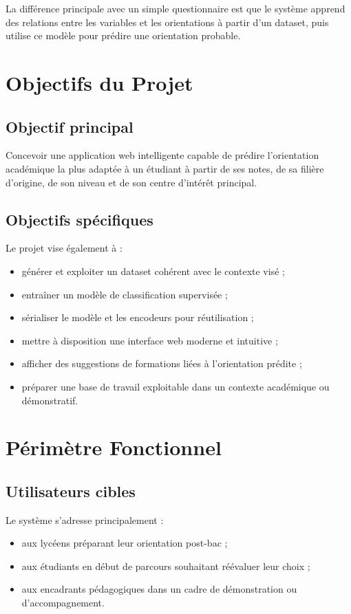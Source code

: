 \documentclass[12pt,a4paper]{report}
\begin{document}
La différence principale avec un simple questionnaire est que le système apprend des relations entre les variables et les orientations à partir d'un dataset, puis utilise ce modèle pour prédire une orientation probable.

\chapter{Objectifs du Projet}

\section{Objectif principal}
Concevoir une application web intelligente capable de prédire l'orientation académique la plus adaptée à un étudiant à partir de ses notes, de sa filière d'origine, de son niveau et de son centre d'intérêt principal.

\section{Objectifs spécifiques}
Le projet vise également à :
\begin{itemize}[label=--]
    \item générer et exploiter un dataset cohérent avec le contexte visé ;
    \item entraîner un modèle de classification supervisée ;
    \item sérialiser le modèle et les encodeurs pour réutilisation ;
    \item mettre à disposition une interface web moderne et intuitive ;
    \item afficher des suggestions de formations liées à l'orientation prédite ;
    \item préparer une base de travail exploitable dans un contexte académique ou démonstratif.
\end{itemize}

\chapter{Périmètre Fonctionnel}

\section{Utilisateurs cibles}
Le système s'adresse principalement :
\begin{itemize}[label=--]
    \item aux lycéens préparant leur orientation post-bac ;
    \item aux étudiants en début de parcours souhaitant réévaluer leur choix ;
    \item aux encadrants pédagogiques dans un cadre de démonstration ou d'accompagnement.
\end{itemize}
\end{document}
